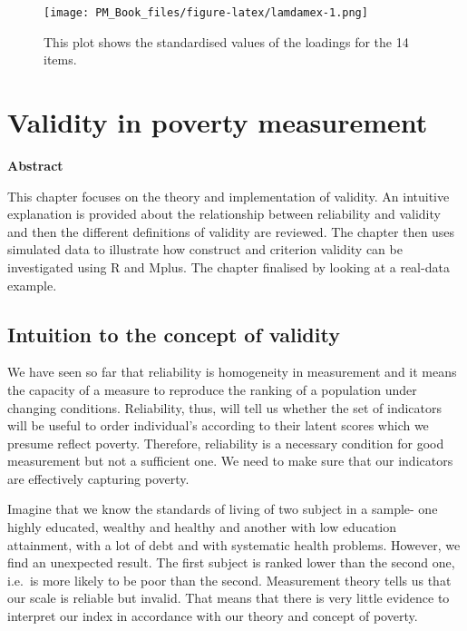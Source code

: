 \documentclass[]{book}
\begin{document}
\begin{figure}
\centering
\texttt{[image: PM\_Book\_files/figure-latex/lamdamex-1.png]}
\caption{\label{fig:lamdamex}This plot shows the standardised values of the loadings for the 14 items.}
\end{figure}

\hypertarget{Chapter-4}{%
\chapter{Validity in poverty measurement}\label{Chapter-4}}

\textbf{Abstract}

This chapter focuses on the theory and implementation of validity. An intuitive explanation is provided about the relationship between reliability and validity and then the different definitions of validity are reviewed. The chapter then uses simulated data to illustrate how construct and criterion validity can be investigated using R and Mplus. The chapter finalised by looking at a real-data example.

\hypertarget{intuition-to-the-concept-of-validity}{%
\section{Intuition to the concept of validity}\label{intuition-to-the-concept-of-validity}}

We have seen so far that reliability is homogeneity in measurement and it means the capacity of a measure to reproduce the ranking of a population under changing conditions. Reliability, thus, will tell us whether the set of indicators will be useful to order individual's according to their latent scores which we presume reflect poverty. Therefore, reliability is a necessary condition for good measurement but not a sufficient one. We need to make sure that our indicators are effectively capturing poverty.

Imagine that we know the standards of living of two subject in a sample- one highly educated, wealthy and healthy and another with low education attainment, with a lot of debt and with systematic health problems. However, we find an unexpected result. The first subject is ranked lower than the second one, i.e.~is more likely to be poor than the second. Measurement theory tells us that our scale is reliable but invalid. That means that there is very little evidence to interpret our index in accordance with our theory and concept of poverty.
\end{document}

